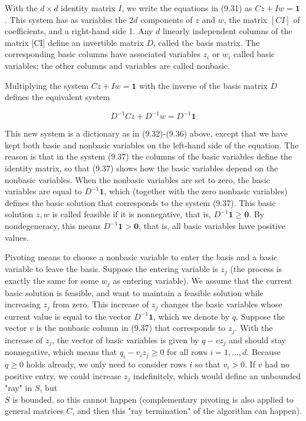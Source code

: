 \documentclass[12pt]{article}
\begin{document}
With the $d \times d$ identity matrix $I$, we write the equations in (9.31) as $C z+I w=\mathbf{1}$. This system has as variables the $2 d$ components of $z$ and $w$, the matrix $[C I]$ of coefficients, and a right-hand side 1. Any $d$ linearly independent columns of the matrix [CI] define an invertible matrix $D$, called the basis matrix. The corresponding basic columns have associated variables $z_{i}$ or $w_{i}$ called basic variables; the other columns and variables are called nonbasic.

Multiplying the system $C z+I w=\mathbf{1}$ with the inverse of the basis matrix $D$ defines the equivalent system


\begin{equation*}
D^{-1} C z+D^{-1} w=D^{-1} \mathbf{1} \tag{9.37}
\end{equation*}


This new system is a dictionary as in (9.32)-(9.36) above, except that we have kept both basic and nonbasic variables on the left-hand side of the equation. The reason is that in the system (9.37) the columns of the basic variables define the identity matrix, so that (9.37) shows how the basic variables depend on the nonbasic variables. When the nonbasic variables are set to zero, the basic variables are equal to $D^{-1} \mathbf{1}$, which (together with the zero nonbasic variables) defines the basic solution that corresponds to the system (9.37). This basic solution $z, w$ is called feasible if it is nonnegative, that is, $D^{-1} \mathbf{1} \geq \mathbf{0}$. By nondegeneracy, this means $D^{-1} \mathbf{1}>\mathbf{0}$, that is, all basic variables have positive values.

Pivoting means to choose a nonbasic variable to enter the basis and a basic variable to leave the basis. Suppose the entering variable is $z_{j}$ (the process is exactly the same for some $w_{j}$ as entering variable). We assume that the current basic solution is feasible, and want to maintain a feasible solution while increasing $z_{j}$ from zero. This increase of $z_{j}$ changes the basic variables whose current value is equal to the vector $D^{-1} \mathbf{1}$, which we denote by $q$. Suppose the vector $v$ is the nonbasic column in (9.37) that corresponds to $z_{j}$. With the increase of $z_{j}$, the vector of basic variables is given by $q-v z_{j}$ and should stay nonnegative, which means that $q_{i}-v_{i} z_{j} \geq 0$ for all rows $i=1, \ldots, d$. Because $q \geq 0$ holds already, we only need to consider rows $i$ so that $v_{i}>0$. If $v$ had no positive entry, we could increase $z_{j}$ indefinitely, which would define an unbounded "ray" in $S$, but\\
$S$ is bounded, so this cannot happen (complementary pivoting is also applied to general matrices $C$, and then this "ray termination" of the algorithm can happen).
\end{document}
